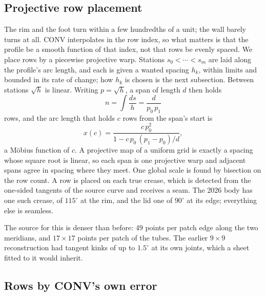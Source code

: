 \documentclass[journal]{IEEEtran}
\begin{document}
\subsection{Projective row placement}

The rim and the foot turn within a few hundredths of a unit; the wall
barely turns at all. CONV interpolates in the row index, so what matters
is that the profile be a smooth function of that index, not that rows be
evenly spaced. We place rows by a piecewise projective warp. Stations
$s_0<\cdots<s_m$ are laid along the profile's arc length, and each is given
a wanted spacing $h_k$, within limits and bounded in its rate of change;
how $h_k$ is chosen is the next subsection. Between stations
$\sqrt h$ is linear. Writing $p=\sqrt h$, a span of length $d$ then holds
\begin{equation}
 n=\int\frac{ds}{h}=\frac{d}{p_0\,p_1}
 \label{eq:rowsinspan}
\end{equation}
rows, and the arc length that holds $c$ rows from the span's start is
\begin{equation}
 x(c)=\frac{c\,p_0^2}{1-c\,p_0\,(p_1-p_0)/d},
 \label{eq:moebius}
\end{equation}
a M\"obius function of $c$. A projective map of a uniform grid is exactly
a spacing whose square root is linear, so each span is one projective
warp and adjacent spans agree in spacing where they meet. One global
scale is found by bisection on the row count. A row is placed on each
true crease, which is detected from the one-sided tangents of the source
curve and receives a seam. The 2026 body has one such crease, of
$115^\circ$ at the rim, and the lid one of $90^\circ$ at its edge;
everything else is seamless.

The source for this is denser than before: 49 points per patch edge along
the two meridians, and $17\times17$ points per patch of the tubes. The
earlier $9\times9$ reconstruction had tangent kinks of up to $1.5^\circ$
at its own joints, which a sheet fitted to it would inherit.

\subsection{Rows by CONV's own error}
\end{document}
